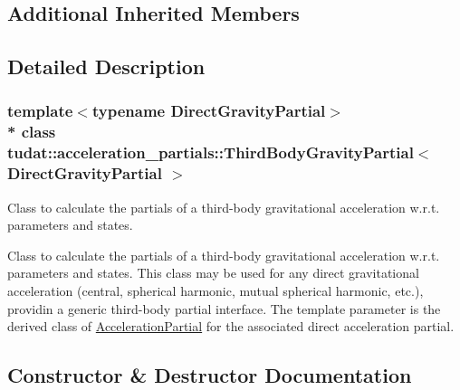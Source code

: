 \subsection*{Additional Inherited Members}


\subsection{Detailed Description}
\subsubsection*{template$<$typename Direct\+Gravity\+Partial$>$\\*
class tudat\+::acceleration\+\_\+partials\+::\+Third\+Body\+Gravity\+Partial$<$ Direct\+Gravity\+Partial $>$}

Class to calculate the partials of a third-\/body gravitational acceleration w.\+r.\+t. parameters and states. 

Class to calculate the partials of a third-\/body gravitational acceleration w.\+r.\+t. parameters and states. This class may be used for any direct gravitational acceleration (central, spherical harmonic, mutual spherical harmonic, etc.), providin a generic third-\/body partial interface. The template parameter is the derived class of \hyperlink{classtudat_1_1acceleration__partials_1_1AccelerationPartial}{Acceleration\+Partial} for the associated direct acceleration partial. 

\subsection{Constructor \& Destructor Documentation}
